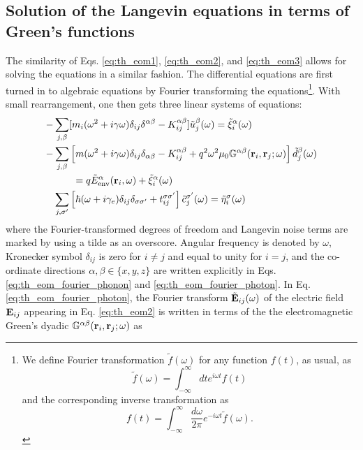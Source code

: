 \subsection{Solution of the Langevin equations in terms of Green's functions}
\label{sec:th_eom_solution}
The similarity of Eqs. \eqref{eq:th_eom1}, \eqref{eq:th_eom2}, and \eqref{eq:th_eom3} allows for solving the equations in a similar fashion. The differential equations are first turned in to algebraic equations by Fourier transforming the equations\footnote{We define Fourier transformation $\tilde f(\omega)$ for any function $f(t)$, as usual, as
\begin{equation}
 \tilde f(\omega) = \int_{-\infty}^{\infty} dt e^{i\omega t} f(t) \label{eq:th_fourier}
\end{equation}
and the corresponding inverse transformation as
\begin{equation}
 f(t) = \int_{-\infty}^{\infty} \frac{d\omega}{2\pi} e^{-i\omega t}\tilde f(\omega). \label{eq:th_fourier_inv}
\end{equation}}.
With small rearrangement, one then gets three linear systems of equations:
\begin{subequations}
\begin{align}
   - & \sum_{j,\beta}  [m_i (\omega^2+i\gamma \omega) \delta_{ij}\delta^{\alpha\beta} - K_{ij}^{\alpha\beta}] \tilde{u}_j^{\beta}(\omega) = \tilde \xi_i^{\alpha}(\omega) \label{eq:th_eom_fourier_phonon} \\
  - &  \sum_{j,\beta} \left[m(\omega^2+i\gamma\omega) \delta_{ij}\delta_{\alpha\beta} - K_{ij}^{\alpha\beta} +q^2 \omega^2 \mu_0 \mathbb{G}^{\alpha\beta}(\mathbf{r}_i,\mathbf{r}_j;\omega) \right]\tilde{d}_j^{\beta}(\omega) \notag \\
  & \qquad = q\tilde{E}_{\textrm{env}}^{\alpha}(\mathbf{r}_i,\omega) + \tilde{\xi}^{\alpha}_i(\omega) \label{eq:th_eom_fourier_photon} \\ 
  &  \sum_{j,\sigma'} \left[\hbar (\omega+i\gamma_e) \delta_{ij}\delta_{\sigma\sigma'} + t_{ij}^{\sigma\sigma'} \right] \tilde c_j^{\sigma'}(\omega) = \tilde \eta_i^{\sigma}(\omega)   \label{eq:th_eom_fourier_electron}
\end{align}
\end{subequations}
where the Fourier-transformed degrees of freedom and Langevin noise terms are marked by using a tilde as an overscore. Angular frequency is denoted by $\omega$, Kronecker symbol $\delta_{ij}$ is zero for $i\neq j$ and equal to unity for $i=j$, and the co-ordinate directions $\alpha,\beta \in \{x,y,z\}$ are written explicitly in Eqs. \eqref{eq:th_eom_fourier_phonon} and \eqref{eq:th_eom_fourier_photon}. In Eq. \eqref{eq:th_eom_fourier_photon}, the Fourier transform $\tilde{\mathbf{E}}_{ij}(\omega)$ of the electric field $\mathbf{E}_{ij}$ appearing in Eq. \eqref{eq:th_eom2} is written in terms of the the electromagnetic Green's dyadic $\mathbb{G}^{\alpha\beta}(\mathbf{r}_i,\mathbf{r}_j;\omega)$ as \cite{novotny}
